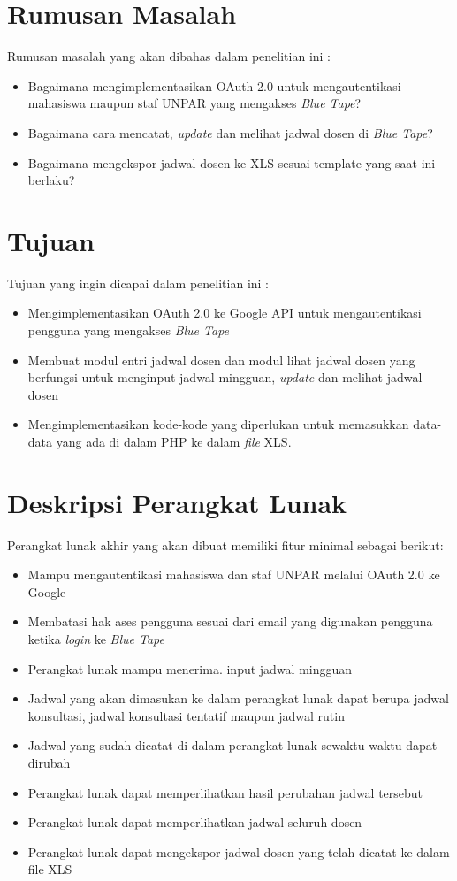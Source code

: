 \documentclass[a4paper,twoside]{article}
\begin{document}
\section{Rumusan Masalah}
Rumusan masalah yang akan dibahas dalam penelitian ini :
	\begin{itemize}
		\item Bagaimana mengimplementasikan OAuth 2.0 untuk mengautentikasi mahasiswa maupun staf UNPAR yang mengakses \textit{Blue Tape}?
		\item Bagaimana cara mencatat, \textit{update} dan melihat jadwal dosen di \textit{Blue Tape}?
		\item Bagaimana mengekspor jadwal dosen ke XLS sesuai template yang saat ini berlaku?
	\end{itemize}

\section{Tujuan}
Tujuan yang ingin dicapai dalam penelitian ini : 
	\begin{itemize}
		\item Mengimplementasikan OAuth 2.0 ke Google API untuk mengautentikasi pengguna yang mengakses \textit{Blue Tape}
		\item Membuat modul entri jadwal dosen dan modul lihat jadwal dosen yang berfungsi untuk menginput jadwal mingguan, \textit{update} dan melihat jadwal dosen
		\item Mengimplementasikan kode-kode yang diperlukan untuk memasukkan data-data yang ada di dalam PHP ke dalam \textit{file} XLS. 

	\end{itemize}

\section{Deskripsi Perangkat Lunak}
Perangkat lunak akhir yang akan dibuat memiliki fitur minimal sebagai berikut:
\begin{itemize}
	\item Mampu mengautentikasi mahasiswa dan staf UNPAR melalui OAuth 2.0 ke Google
	\item Membatasi hak ases pengguna sesuai dari email yang digunakan pengguna ketika \textit{login} ke \textit{Blue Tape}
	\item Perangkat lunak mampu menerima.  input jadwal mingguan 
	\item Jadwal yang akan dimasukan ke dalam perangkat lunak dapat berupa jadwal konsultasi, jadwal konsultasi tentatif maupun jadwal rutin
	\item Jadwal yang sudah dicatat di dalam perangkat lunak sewaktu-waktu dapat dirubah
	\item Perangkat lunak dapat memperlihatkan hasil perubahan jadwal tersebut
	\item Perangkat lunak dapat memperlihatkan jadwal seluruh dosen
	\item Perangkat lunak dapat mengekspor jadwal dosen yang telah dicatat ke dalam file XLS
\end{itemize}
\end{document}
